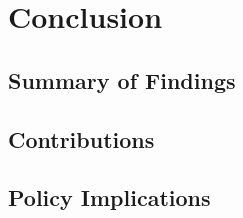 \section{Conclusion}
\label{ch:conclusion}


\subsection{Summary of Findings}
\label{sec:summary}


\subsection{Contributions}
\label{sec:contributions}


\subsection{Policy Implications}
\label{sec:policy}

